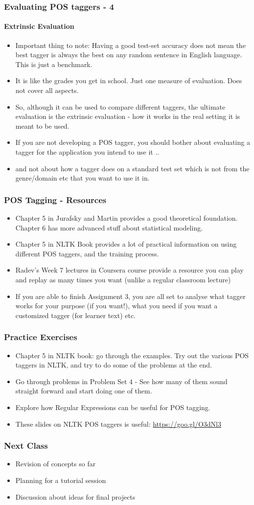 \documentclass{beamer}
\begin{document}
\begin{frame}
\frametitle{Evaluating POS taggers - 4}
\framesubtitle{Extrinsic Evaluation}
\begin{itemize}
\item Important thing to note: Having a good test-set accuracy does not mean the best tagger is always the best on any random sentence in English language. This is just a benchmark.
\item It is like the grades you get in school. Just one measure of evaluation. Does not cover all aspects. 
\item So, although it can be used to compare different taggers, the ultimate evaluation is the extrinsic evaluation - how it works in the real setting it is meant to be used. 
\item If you are not developing a POS tagger, you should bother about evaluating a tagger for the application you intend to use it ..
\item and not about how a tagger does on a standard test set which is not from the genre/domain etc that you want to use it in. 
\end{itemize}
\end{frame}

\begin{frame}
\frametitle{POS Tagging - Resources}
\begin{itemize}
\item Chapter 5 in Jurafsky and Martin provides a good theoretical foundation. Chapter 6 has more advanced stuff about statistical modeling.
\item Chapter 5 in NLTK Book provides a lot of practical information on using different POS taggers, and the training process.
\item Radev's Week 7 lectures in Coursera course provide a resource you can play and replay as many times you want (unlike a regular classroom lecture)
\item If you are able to finish Assignment 3, you are all set to analyse what tagger works for your purpose (if you want!), what you need if you want a customized tagger (for learner text) etc. 
\end{itemize}
\end{frame}

\begin{frame}
\frametitle{Practice Exercises}
\begin{itemize}
\item Chapter 5 in NLTK book: go through the examples. Try out the various POS taggers in NLTK, and try to do some of the problems at the end.
\item Go through problems in Problem Set 4 - See how many of them sound straight forward and start doing one of them.
\item Explore how Regular Expressions can be useful for POS tagging.
\item These slides on NLTK POS taggers is useful: \url{https://goo.gl/O3dNl3}
\end{itemize}
\end{frame}

\begin{frame}
\frametitle{Next Class}
\begin{itemize}
\item Revision of concepts so far
\item Planning for a tutorial session
\item Discussion about ideas for final projects
\end{itemize}
\end{frame}
\end{document}

